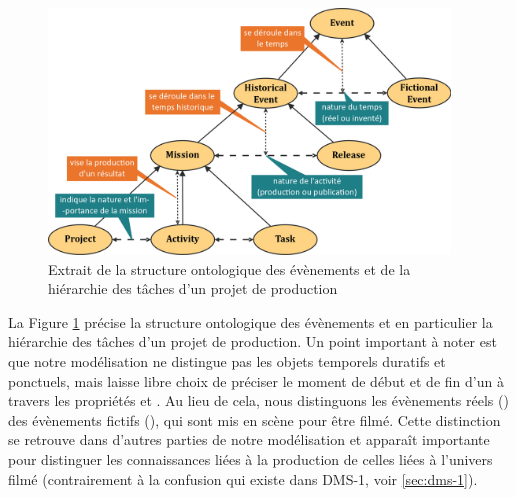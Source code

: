 \begin{figure}[ht!]
\centering
\includegraphics[width=0.95\textwidth]{./images/SO-Event-v1.png}
\caption{Extrait de la structure ontologique des évènements et de la hiérarchie des tâches d'un projet de production}
\label{img:so-event}
\end{figure}


La Figure \ref{img:so-event} précise la structure ontologique des évènements et en particulier la hiérarchie des tâches d'un projet de production.
Un point important à noter est que notre modélisation ne distingue pas les objets temporels duratifs et ponctuels, mais laisse libre choix de préciser le moment de début et de fin d'un  à travers les propriétés  et .
Au lieu de cela, nous distinguons les évènements réels () des évènements fictifs (), qui sont mis en scène pour être filmé. 
Cette distinction se retrouve dans d'autres parties de notre modélisation et apparaît importante pour distinguer les connaissances liées à la production de celles liées à l'univers filmé (contrairement à la confusion qui existe dans DMS-1, voir \ref{sec:dms-1}).



